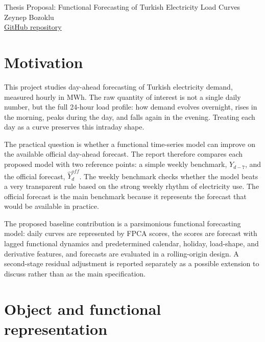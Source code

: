 \documentclass[10pt,a4paper]{article}
\begin{document}
\fontsize{9.2}{10.8}\selectfont

\begin{center}
{\Large Thesis Proposal: Functional Forecasting of Turkish Electricity Load Curves}\\
\vspace{0.5em}
{\normalsize Zeynep Bozoklu}\\
\vspace{0.25em}
{\small \href{https://github.com/zebozoklu/turkey-electricity-fda}{GitHub repository}}
\end{center}

\vspace{-0.5em}

\section*{Motivation}

This project studies day-ahead forecasting of Turkish electricity demand, measured hourly in MWh. The raw
quantity of interest is not a single daily number, but the full 24-hour load profile:
how demand evolves overnight, rises in the morning, peaks during the day, and falls
again in the evening. Treating each day as a curve preserves this intraday shape.

The practical question is whether a functional time-series model can improve on the
available official day-ahead forecast. The report therefore compares each proposed
model with two reference points: a simple weekly benchmark, \(Y_{d-7}\), and the
official forecast, \(\widehat Y^{off}_d\). The weekly benchmark checks whether the
model beats a very transparent rule based on the strong weekly rhythm of electricity
use. The official forecast is the main benchmark because it represents the forecast
that would be available in practice.

The proposed baseline contribution is a parsimonious functional forecasting model:
daily curves are represented by FPCA scores, the scores are forecast with lagged
functional dynamics and predetermined calendar, holiday, load-shape, and derivative
features, and forecasts are evaluated in a rolling-origin design. A second-stage
residual adjustment is reported separately as a possible extension to discuss rather
than as the main specification.

\section*{Object and functional representation}
\end{document}
